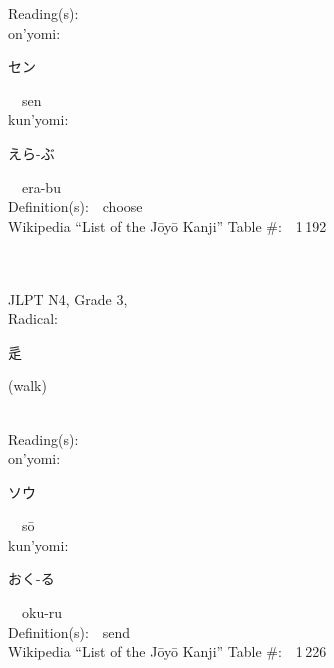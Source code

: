 \begin{multicols}{2}
Reading(s):\ \ \\
{\hspace*{1em}}on'yomi:\ \ \\
{\hspace*{2em}}{\begin{CJK}{UTF8}{min} セン \end{CJK}}\ \ sen\ \ \\
{\hspace*{1em}}kun'yomi:\ \ \\
{\hspace*{2em}}{\begin{CJK}{UTF8}{min} えら-ぶ \end{CJK}}\ \ era-bu\ \ \\
Definition(s):\ \ choose \\
Wikipedia ``List of the J\=oy\=o Kanji'' Table \#:\ \ 1\,192 \\
\ \ \\
{\fontsize{34pt}{40pt}  }\ \ \\  %
{JLPT N4, Grade 3, \\Radical:\ \ {\begin{CJK}{UTF8}{min} 辵 \end{CJK}} (walk) } \\
Reading(s):\ \ \\
{\hspace*{1em}}on'yomi:\ \ \\
{\hspace*{2em}}{\begin{CJK}{UTF8}{min} ソウ \end{CJK}}\ \ s\=o\ \ \\
{\hspace*{1em}}kun'yomi:\ \ \\
{\hspace*{2em}}{\begin{CJK}{UTF8}{min} おく-る \end{CJK}}\ \ oku-ru\ \ \\
Definition(s):\ \ send \\
Wikipedia ``List of the J\=oy\=o Kanji'' Table \#:\ \ 1\,226 \\
\ \ \\
{\fontsize{34pt}{40pt}  }\ \ \\  %

\end{multicols}
